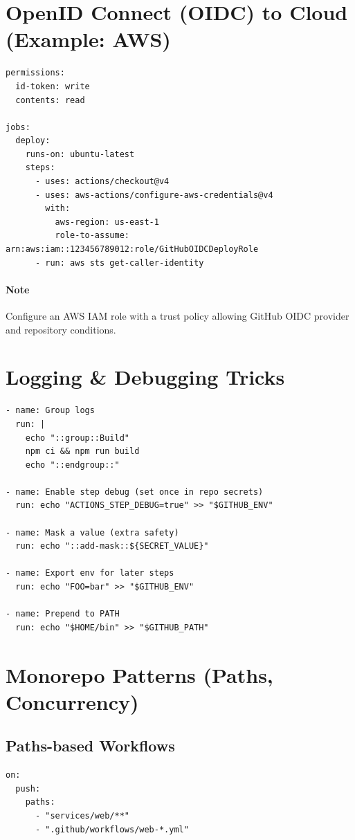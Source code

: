 \documentclass[11pt]{article}
\begin{document}
\section{OpenID Connect (OIDC) to Cloud (Example: AWS)}
\begin{verbatim}
permissions:
  id-token: write
  contents: read

jobs:
  deploy:
    runs-on: ubuntu-latest
    steps:
      - uses: actions/checkout@v4
      - uses: aws-actions/configure-aws-credentials@v4
        with:
          aws-region: us-east-1
          role-to-assume: arn:aws:iam::123456789012:role/GitHubOIDCDeployRole
      - run: aws sts get-caller-identity
\end{verbatim}
\paragraph{Note} Configure an AWS IAM role with a trust policy allowing GitHub OIDC provider and repository conditions.

\section{Logging \& Debugging Tricks}
\begin{verbatim}
- name: Group logs
  run: |
    echo "::group::Build"
    npm ci && npm run build
    echo "::endgroup::"

- name: Enable step debug (set once in repo secrets)
  run: echo "ACTIONS_STEP_DEBUG=true" >> "$GITHUB_ENV"

- name: Mask a value (extra safety)
  run: echo "::add-mask::${SECRET_VALUE}"

- name: Export env for later steps
  run: echo "FOO=bar" >> "$GITHUB_ENV"

- name: Prepend to PATH
  run: echo "$HOME/bin" >> "$GITHUB_PATH"
\end{verbatim}

\section{Monorepo Patterns (Paths, Concurrency)}
\subsection{Paths-based Workflows}
\begin{verbatim}
on:
  push:
    paths:
      - "services/web/**"
      - ".github/workflows/web-*.yml"
\end{verbatim}
\end{document}
